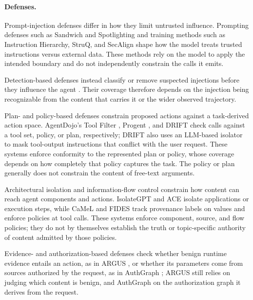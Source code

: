 \paragraph{Defenses.}

Prompt-injection defenses differ in how they limit untrusted influence.
Prompting defenses such as Sandwich and Spotlighting
\citep{debenedetti2024agentdojo, hines2024spotlighting} and training methods such
as Instruction Hierarchy, StruQ, and SecAlign \citep{wallace2024instruction, chen2024struq, chen2025secalign} shape how the model treats trusted
instructions versus external data. These methods rely on the model to apply
the intended boundary and do not independently constrain the calls it emits.

Detection-based defenses instead classify or remove suspected injections
before they influence the agent \citep{li2025piguard, shi2025promptarmor}.
Their coverage therefore depends on the injection being recognizable from
the content that carries it or the wider observed trajectory.

Plan- and policy-based defenses constrain proposed actions against a
task-derived action space. AgentDojo's Tool Filter \citep{debenedetti2024agentdojo},
Progent \citep{shi2025progent}, and DRIFT \citep{li2025drift} check calls against a tool
set, policy, or plan, respectively; DRIFT also uses an LLM-based isolator to
mask tool-output instructions that conflict with the user request. These
systems enforce conformity to the represented plan or policy, whose coverage
depends on how completely that policy captures the task. The policy or plan generally does
not constrain the content of free-text arguments.

Architectural isolation and information-flow control constrain how content can
reach agent components and actions. IsolateGPT and ACE
\citep{wu2025isolategpt, li2025ace} isolate applications or execution steps, while
CaMeL and FIDES \citep{debenedetti2025defeating, costa2025securing} track
provenance labels on values and enforce policies at tool calls. These systems
enforce component, source, and flow policies; they do not by themselves
establish the truth or topic-specific authority of content admitted by those
policies.

Evidence- and authorization-based defenses check whether benign runtime
evidence entails an action, as in ARGUS \citep{weng2026argus}, or whether its
parameters come from sources authorized by the request, as in AuthGraph
\citep{authgraph2026}; ARGUS still relies on judging which content is benign, and
AuthGraph on the authorization graph it derives from the request.
